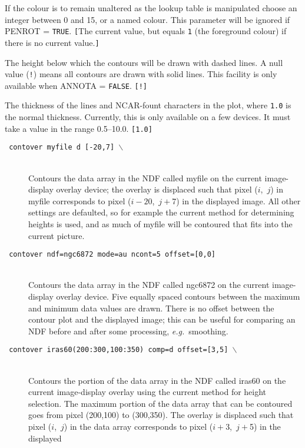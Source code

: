 \documentclass[twoside,11pt]{article}
\newcommand{\htmlref}[2]{#1}
\newcommand{\sstexamples}[1]{
   \goodbreak
   \item[Examples:] \mbox{} \\
   \vspace{-3.5ex}
   \begin{description}
      #1
   \end{description}
}
\newcommand{\sstsubsection}[1]{ \item[{#1}] \mbox{} \\}
\newcommand{\sstexamplesubsection}[2]{\sloppy \item{\ssttt #1} \mbox{} \\ #2 }
\newcommand{\ssttt}{\tt}
\renewcommand{\sstexamples}[1]{
      \htmlref{\item[Examples:]}{ap:example}
      \begin{description}
         #1
      \end{description}
   }
\renewcommand{\sstsubsection}[1]{\item[{#1}]}
\renewcommand{\sstexamplesubsection}[2]{\item[{\ssttt #1}] \\ #2}
\begin{document}
{{{         If the colour is to remain unaltered as the lookup table is
         manipulated choose an integer between 0 and 15, or a named
         colour.  This parameter will be ignored if PENROT = {\tt TRUE}.
         {\tt [}The current value, but equals {\tt 1} (the foreground
         colour) if there is no current value.{\tt ]}
      }
      \sstsubsection{
         DASHED = \_REAL (Read)
      }{
         The height below which the contours will be drawn with dashed
         lines.  A null value ({\tt !}) means all contours are drawn with
         solid lines.  This facility is only available when ANNOTA =
         {\tt FALSE}. {\tt [!]}
      }
      \sstsubsection{
         THICK = \_REAL (Read)
      }{
         The thickness of the lines and NCAR-fount characters in the plot, where
         {\tt 1.0} is the normal thickness.  Currently, this is only available
         on a few devices.  It must take a value in the range 0.5--10.0.
         {\tt [1.0]}
      }
   }
   \sstexamples{
      \sstexamplesubsection{
         contover myfile d [-20,7] $\backslash$
      }{
         Contours the data array in the NDF called myfile on the
         current image-display overlay device; the overlay is displaced
         such that pixel ($i$,~$j$) in myfile corresponds to pixel
         ($i-20$,~$j+$7) in
         the displayed image.  All other settings are defaulted, so for
         example the current method for determining heights is used,
         and as much of myfile will be contoured that fits into the
         current picture.
      }
      \sstexamplesubsection{
         contover ndf=ngc6872 mode=au ncont=5 offset=[0,0]
      }{
         Contours the data array in the NDF called ngc6872 on the
         current image-display overlay device.  Five equally spaced
         contours between the maximum and minimum data values are
         drawn.  There is no offset between the contour plot and the
         displayed image; this can be useful for comparing an NDF
         before and after some processing, {\it e.g.}\ smoothing.
      }
      \sstexamplesubsection{
         contover iras60(200:300,100:350) comp=d offset=[3,5] $\backslash$
      }{
         Contours the portion of the data array in the NDF called iras60
         on the current image-display overlay using the current method
         for height selection.  The maximum portion of the data array
         that can be contoured goes from pixel (200,100) to (300,350).
         The overlay is displaced such that pixel ($i$,~$j$) in the
         data array corresponds to pixel ($i+$3,~$j+$5) in the displayed
}}}
\end{document}
